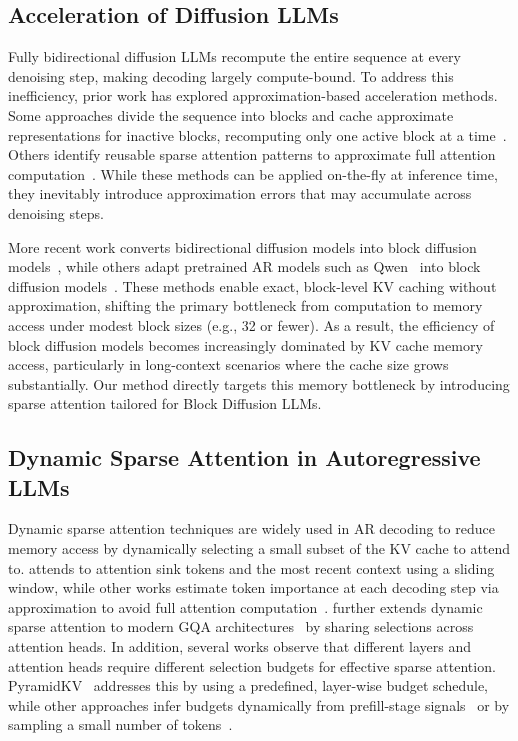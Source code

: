 \subsection{Acceleration of Diffusion LLMs}

Fully bidirectional diffusion LLMs recompute the entire sequence at every denoising step, making decoding largely compute-bound. 
To address this inefficiency, prior work has explored approximation-based acceleration methods. 
Some approaches divide the sequence into blocks and cache approximate representations for inactive blocks, recomputing only one active block at a time~\cite{wu2025fastdllmv2, cheng2025sdar}. 
Others identify reusable sparse attention patterns to approximate full attention computation~\cite{wang2025sparsed}. 
While these methods can be applied on-the-fly at inference time, they inevitably introduce approximation errors that may accumulate across denoising steps.

More recent work converts bidirectional diffusion models into block diffusion models~\cite{wang2025d2f, kim2025cdlm}, 
while others adapt pretrained AR models such as Qwen~\cite{yang2025qwen3} into block diffusion models~\cite{wu2025fastdllmv2, cheng2025sdar}. 
These methods enable exact, block-level KV caching without approximation, shifting the primary bottleneck from computation to memory access under modest block sizes (e.g., 32 or fewer). 
As a result, the efficiency of block diffusion models becomes increasingly dominated by KV cache memory access, particularly in long-context scenarios where the cache size grows substantially.
Our method directly targets this memory bottleneck by introducing sparse attention tailored for Block Diffusion LLMs.

\subsection{Dynamic Sparse Attention in Autoregressive LLMs}

Dynamic sparse attention techniques are widely used in AR decoding to reduce memory access by dynamically selecting a small subset of the KV cache to attend to.
\citet{xiao2024streamingllm} attends to attention sink tokens and the most recent context using a sliding window, while other works estimate token importance at each decoding step via approximation to avoid full attention computation~\cite{tang2024quest, yang2025tidaldecode}. 
\citet{yang2025lessismore} further extends dynamic sparse attention to modern GQA architectures~\cite{ainslie2023gqa} by sharing selections across attention heads.
In addition, several works observe that different layers and attention heads require different selection budgets for effective sparse attention.
PyramidKV~\cite{cai2024pyramidkv} addresses this by using a predefined, layer-wise budget schedule, while other approaches infer budgets dynamically from prefill-stage signals~\cite{tu2025vlcache} or by sampling a small number of tokens~\cite{feng2025adakv, zhu2025tactic, lin2025twilight}.

